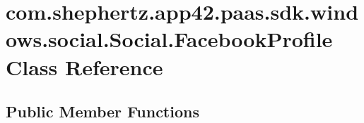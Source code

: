 \hypertarget{classcom_1_1shephertz_1_1app42_1_1paas_1_1sdk_1_1windows_1_1social_1_1_social_1_1_facebook_profile}{\section{com.\+shephertz.\+app42.\+paas.\+sdk.\+windows.\+social.\+Social.\+Facebook\+Profile Class Reference}
\label{classcom_1_1shephertz_1_1app42_1_1paas_1_1sdk_1_1windows_1_1social_1_1_social_1_1_facebook_profile}
}
\subsection*{Public Member Functions}
